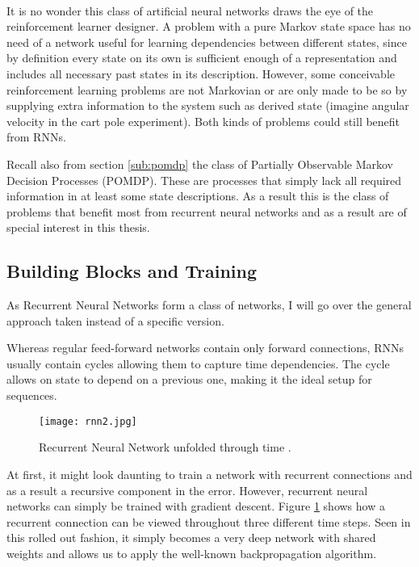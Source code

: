 \paragraph{}
It is no wonder this class of artificial neural networks
draws the eye of the reinforcement learner designer.
A problem with a pure Markov state space
has no need of a network useful for learning dependencies between different states,
since by definition every state on its own is sufficient enough of a representation
and includes all necessary past states in its description.
However, some conceivable reinforcement learning problems
are not Markovian
or are only made to be so
by supplying extra information to the system
such as derived state
(imagine angular velocity in the cart pole experiment).
Both kinds of problems
could still benefit from RNNs.

Recall also from section \ref{sub:pomdp}
the class of Partially Observable Markov Decision Processes (POMDP).
These are processes that simply lack all required information in
at least some state descriptions.
As a result this is the class of problems that benefit most
from recurrent neural networks
and as a result are of special interest in this thesis.

\subsection{Building Blocks and Training}
\label{sub:building_blocks_and_training}
As Recurrent Neural Networks form a class of networks,
I will go over the general approach taken instead of a specific version.

Whereas regular feed-forward networks contain only forward connections,
RNNs usually contain cycles allowing them to capture time dependencies.
The cycle allows on state to depend on a previous one,
making it the ideal setup for sequences.

\begin{figure}[htpb]
  \centering
  \texttt{[image: rnn2.jpg]}
  \caption[Recurrent neural network time unfolding]{
    Recurrent Neural Network unfolded through time
    \parencite{Y.2015a}.
  }
  \label{fig:rnn}
\end{figure}

At first, it might look daunting to train a network with recurrent connections
and as a result a recursive component in the error.
However, recurrent neural networks can simply be trained with gradient descent.
Figure \ref{fig:rnn} shows how a recurrent connection can be viewed
throughout three different time steps.
Seen in this rolled out fashion,
it simply becomes a very deep network with shared weights
and allows us to apply the well-known backpropagation algorithm.

